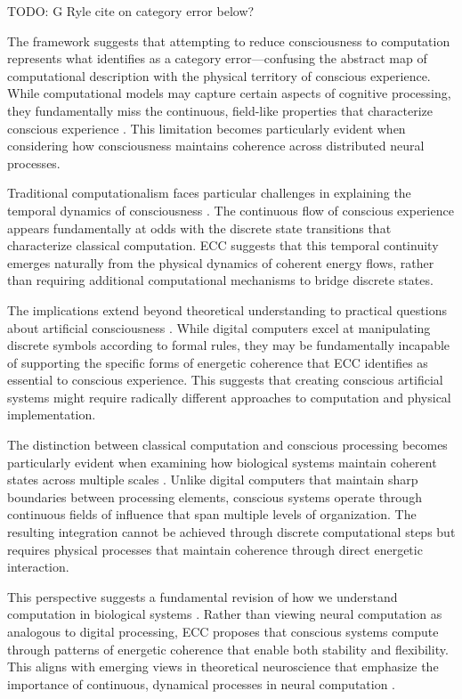 \begin{refsection}
TODO: G Ryle cite on category error below?

The framework suggests that attempting to reduce consciousness to computation represents what \cite{Smith2002} identifies as a category error—confusing the abstract map of computational description with the physical territory of conscious experience. While computational models may capture certain aspects of cognitive processing, they fundamentally miss the continuous, field-like properties that characterize conscious experience \cite{Piccinini2015}. This limitation becomes particularly evident when considering how consciousness maintains coherence across distributed neural processes.

Traditional computationalism faces particular challenges in explaining the temporal dynamics of consciousness \cite{Siegelmann2003}. The continuous flow of conscious experience appears fundamentally at odds with the discrete state transitions that characterize classical computation. ECC suggests that this temporal continuity emerges naturally from the physical dynamics of coherent energy flows, rather than requiring additional computational mechanisms to bridge discrete states.

The implications extend beyond theoretical understanding to practical questions about artificial consciousness \cite{Aaronson2013}. While digital computers excel at manipulating discrete symbols according to formal rules, they may be fundamentally incapable of supporting the specific forms of energetic coherence that ECC identifies as essential to conscious experience. This suggests that creating conscious artificial systems might require radically different approaches to computation and physical implementation.

The distinction between classical computation and conscious processing becomes particularly evident when examining how biological systems maintain coherent states across multiple scales \cite{MacLennan2004}. Unlike digital computers that maintain sharp boundaries between processing elements, conscious systems operate through continuous fields of influence that span multiple levels of organization. The resulting integration cannot be achieved through discrete computational steps but requires physical processes that maintain coherence through direct energetic interaction.

This perspective suggests a fundamental revision of how we understand computation in biological systems \cite{Adriaans2013}. Rather than viewing neural computation as analogous to digital processing, ECC proposes that conscious systems compute through patterns of energetic coherence that enable both stability and flexibility. This aligns with emerging views in theoretical neuroscience that emphasize the importance of continuous, dynamical processes in neural computation \cite{Piccinini2015}.


\end{refsection}

